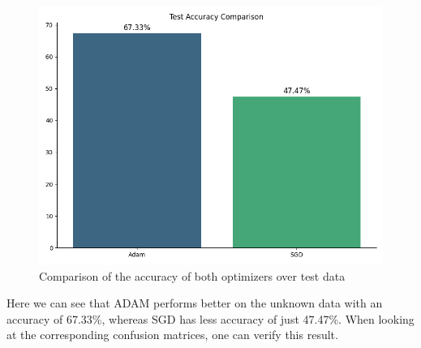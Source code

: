 \documentclass{tubaf-article}
\begin{document}
	\begin{figure}[h!]
		\centering
		\includegraphics[width=\textwidth]{test_acc.png}
		\caption{Comparison of the accuracy of both optimizers over test data}
	\end{figure}
	Here we can see that ADAM performs better on the unknown data with an accuracy of 67.33\%, whereas SGD has less accuracy of just 47.47\%. When looking at the corresponding confusion matrices, one can verify this result.
	
\end{document}
